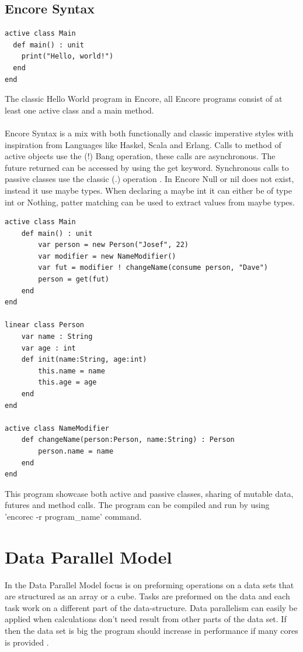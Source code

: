 \subsection{Encore Syntax}
\begin{lstlisting}
active class Main
  def main() : unit
    print("Hello, world!")
  end
end
\end{lstlisting}
The classic Hello World program in Encore, all Encore programs consist of at least one active class and a main method.
\\\\
Encore Syntax is a mix with both functionally and classic imperative styles with inspiration from Languages like Haskel, Scala and Erlang. Calls to method of active objects use the (!) Bang operation, these calls are asynchronous. The future returned can be accessed by using the get keyword. Synchronous calls to passive classes use the classic (.) operation \citep{encore_paper}. In Encore Null or nil does not exist, instead it use maybe types. When declaring a maybe int it can either be of type int or Nothing, patter matching can be used to extract values from maybe types. 

\begin{lstlisting}
active class Main
    def main() : unit
        var person = new Person("Josef", 22)
        var modifier = new NameModifier()
        var fut = modifier ! changeName(consume person, "Dave")
        person = get(fut)
    end
end

linear class Person
    var name : String
    var age : int
    def init(name:String, age:int)
        this.name = name
        this.age = age
    end
end

active class NameModifier
    def changeName(person:Person, name:String) : Person 
        person.name = name
    end
end
\end{lstlisting}
This program showcase both active and passive classes, sharing of mutable data, futures and method calls. The program can be compiled and run by using 'encorec -r program\_name' command. \\

\section{Data Parallel Model}
In the Data Parallel Model focus is on preforming operations on a data sets that are structured as an array or a cube. Tasks are preformed on the data and each task work on a different part of the data-structure. Data parallelism can easily be applied when calculations don’t need result from other parts of the data set. If then the data set is big the program should increase in performance if many cores is provided \citep{paralell-computing}.

